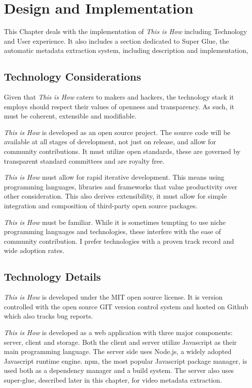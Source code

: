 \chapter{Design and Implementation}
\label{chap_design}

This Chapter deals with the implementation of \textit{This is How} including Technology and User experience. It also includes a section dedicated to Super Glue, the automatic metadata extraction system, including description and implementation, 

\section{Technology Considerations}

Given that \textit{This is How} caters to makers and hackers, the technology stack it employs should respect their values of openness and transparency. As such, it must be coherent, extensible and modifiable.
 
\textit{This is How} is developed as an open source project. The source code will be available at all stages of development, not just on release, and allow for community contributions. It must utilize open standards, these are governed by transparent standard committees and are royalty free. 

\textit{This is How} must allow for rapid iterative development. This means using programming languages, libraries and frameworks that value productivity over other consideration. This also derives extensibility, it must allow for simple integration and composition of third-party open source packages. 

\textit{This is How} must be familiar. While it is sometimes tempting to use niche programming languages and technologies, these interfere with the ease of community contribution. I prefer technologies with a proven track record and wide adoption rates.

\section{Technology Details}

\textit{This is How} is developed under the MIT open source license. It is version controlled with the open source GIT\cite{git} version control system and hosted on Github\cite{github} which also tracks bug reports. 

\textit{This is How} is developed as a web application with three major components: server, client and storage. Both the client and server utilize Javascript as their main programming language. The server side uses Node.js, a widely adopted Javascript runtime engine. npm\cite{npm}, the most popular Javascript package manager, is used both as a dependency manager and a build system. The server also uses super-glue, described later in this chapter, for video metadata extraction.

